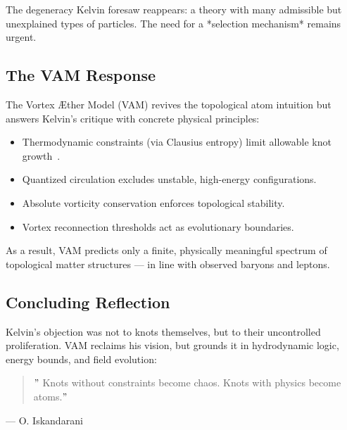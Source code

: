    The degeneracy Kelvin foresaw reappears: a theory with many admissible but unexplained types of particles. The need for a *selection mechanism* remains urgent.

   \subsection*{The VAM Response}

   The Vortex Æther Model (VAM) revives the topological atom intuition but answers Kelvin's critique with concrete physical principles:

   \begin{itemize}
     \item Thermodynamic constraints (via Clausius entropy) limit allowable knot growth~\cite{clausius1865entropy}.
     \item Quantized circulation excludes unstable, high-energy configurations.
     \item Absolute vorticity conservation enforces topological stability.
     \item Vortex reconnection thresholds act as evolutionary boundaries.
   \end{itemize}

   As a result, VAM predicts only a finite, physically meaningful spectrum of topological matter structures — in line with observed baryons and leptons.

   \subsection*{Concluding Reflection}

   Kelvin's objection was not to knots themselves, but to their uncontrolled proliferation. VAM reclaims his vision, but grounds it in hydrodynamic logic, energy bounds, and field evolution:

   \begin{quote}
    \("\) Knots without constraints become chaos. Knots with physics become atoms.\("\)
   \end{quote}
      \begin{flushright}
      — O. Iskandarani
      \end{flushright}
